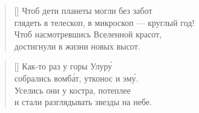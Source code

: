 \documentclass[14pt]{memoir}
\begin{document}
\begin{verse}[\versewidth]
Чтоб дети планеты могли без забот\\
глядеть в телескоп, в микроскоп --- круглый год!\\
Чтоб насмотревшись Вселенной красот,\\
достигнули в жизни новых высот.
\end{verse}

\newpage



\BgThispage

{}
\settowidth{\versewidth}{Серый кот - господин Мыцумото.}
\begin{verse}[\versewidth]
Как-то раз у горы Улур\'{у}\\
собрались вомб\'{а}т, утконос и эм\'{у}.\\
Уселись они у костра, потеплее\\
и стали разглядывать звезды на небе.
\end{verse}
\label{milky-way}
\end{document}
